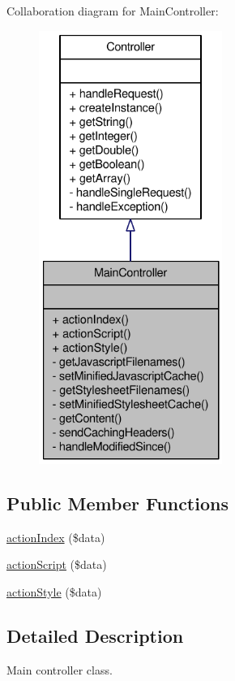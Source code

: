 Collaboration diagram for MainController:\nopagebreak
\begin{figure}[H]
\begin{center}
\leavevmode
\includegraphics[height=400pt]{classMainController__coll__graph}
\end{center}
\end{figure}
\subsection*{Public Member Functions}
\begin{DoxyCompactItemize}
\item 
\hyperlink{classMainController_aa26ba0a9bb1cbc705b092d4a5ba386dd}{actionIndex} (\$data)
\item 
\hyperlink{classMainController_aa1324feb6fda13c88bb642d30f57d23b}{actionScript} (\$data)
\item 
\hyperlink{classMainController_ade96657aa5ad9ae6b7e170aa9d4e2977}{actionStyle} (\$data)
\end{DoxyCompactItemize}


\subsection{Detailed Description}
Main controller class. 

